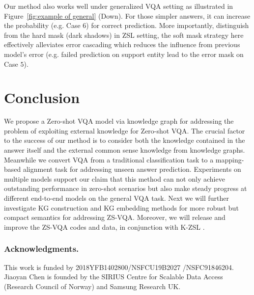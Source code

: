 \documentclass[runningheads]{llncs}
\newcommand{\cjy}[1]{{\color{black}#1}}
\begin{document}
Our method also works well under generalized VQA setting as illustrated in Figure~\ref{fig:example of general} (Down). For those simpler answers, it can increase the probability (e.g. Case $6$) for correct prediction. More importantly, distinguish from the hard mask (dark shadows) in ZSL setting, the soft mask strategy here effectively alleviates error cascading which reduces the influence from previous model's error (e.g. failed prediction on support entity lead to the error mask on Case $5$).
\section{Conclusion}
We propose a Zero-shot VQA model via knowledge graph for addressing the problem of exploiting external knowledge for Zero-shot VQA. 
\cjy{The crucial factor} to the success of our method is to consider both the knowledge contained in \cjy{the} answer itself and the external common sense knowledge from knowledge graphs. Meanwhile we convert VQA from a traditional classification task to a mapping-based alignment task for \cjy{addressing} unseen answer prediction.
Experiments on multiple models support our claim that this method \cjy{can not only} achieve outstanding performance in zero-shot scenarios but also make steady progress at different end-to-end models on \cjy{the general VQA task}. 
Next we will further investigate KG construction and KG embedding \cjy{methods for more robust but compact semantics for addressing ZS-VQA. }
Moreover, we will release and improve the ZS-VQA codes and data, in conjunction with K-ZSL \cite{DBLP:journals/corr/abs-2106-15047}.

\subsubsection{Acknowledgments.}
This work is funded by 2018YFB1402800/NSFCU19B2027 /NSFC91846204.
Jiaoyan Chen is founded by the SIRIUS Centre for Scalable Data Access (Research Council of Norway) and Samsung Research UK.








\end{document}
